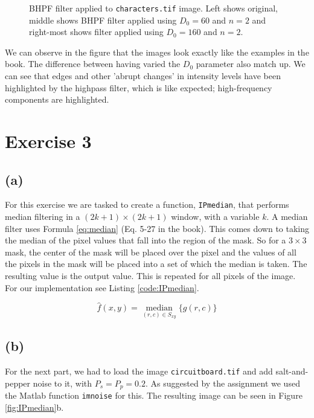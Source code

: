 \documentclass{article}
\begin{document}
\begin{figure}[ht]
    \centering
    
    \caption{BHPF filter applied to \texttt{characters.tif} image. Left shows original, middle shows BHPF filter applied using $D_0 = 60$ and $n = 2$ and right-most shows filter applied using $D_0 = 160$ and $n = 2$.}
    \label{fig:characters_all_bhpf}
\end{figure}

We can observe in the figure that the images look exactly like the examples in the book. The difference between having varied the $D_0$ parameter also match up. We can see that edges and other 'abrupt changes' in intensity levels have been highlighted by the highpass filter, which is like expected; high-frequency components are highlighted.

\section*{Exercise 3}
\subsection*{(a)}
For this exercise we are tasked to create a function, \texttt{IPmedian}, that performs median filtering in a $(2k + 1) \times (2k + 1)$ window, with a variable $k$. A median filter uses Formula \ref{eq:median} (Eq. 5-27 in the book). This comes down to taking the median of the pixel values that fall into the region of the mask. So for a $3 \times 3$ mask, the center of the mask will be placed over the pixel and the values of all the pixels in the mask will be placed into a set of which the median is taken. The resulting value is the output value. This is repeated for all pixels of the image. For our implementation see  Listing \ref{code:IPmedian}.

\begin{equation}\label{eq:median}
    \widehat{f}(x, y)=\underset{(r, c) \in S_{x y}}{\operatorname{median}}\{g(r, c)\}
\end{equation}

\subsection*{(b)}
For the next part, we had to load the image \texttt{circuitboard.tif} and add salt-and-pepper noise to it, with $P_s = P_p = 0.2$. As suggested by the assignment we used the Matlab function \texttt{imnoise} for this. The resulting image can be seen in Figure \ref{fig:IPmedian}b.
\end{document}
